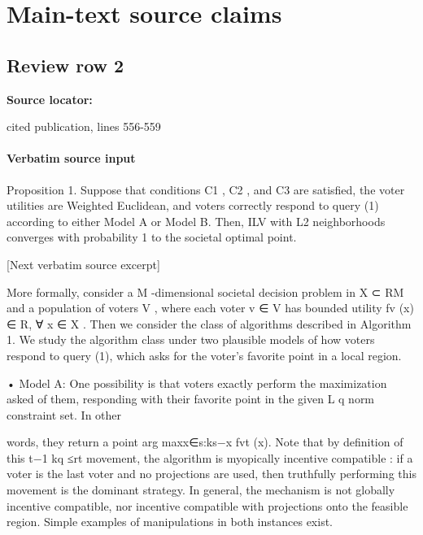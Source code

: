 \documentclass[10pt]{article}
\begin{document}
\section*{Main-text source claims}
\subsection*{Review row 2}
\textbf{Source locator:} {\footnotesize\raggedright cited publication, lines 556-\allowbreak{}559\par}
\paragraph{Verbatim source input}
\begin{ReviewVerbatim}
Proposition 1. Suppose that conditions C1 , C2 , and C3 are satisfied, the voter utilities are
Weighted Euclidean, and voters correctly respond to query (1) according to either Model A
or Model B. Then, ILV with L2 neighborhoods converges with probability 1 to the societal
optimal point.

[Next verbatim source excerpt]

   More formally, consider a M -dimensional societal decision problem in X  ⊂ RM and a
population of voters V , where each voter v ∈ V has bounded utility fv (x) ∈ R, ∀ x ∈ X .
Then we consider the class of algorithms described in Algorithm 1. We study the algorithm
class under two plausible models of how voters respond to query (1), which asks for the
voter's favorite point in a local region.



• Model A:       One possibility is that voters exactly perform the maximization asked of
  them, responding with their favorite point in the given L
                                                                       q norm constraint set. In other

  words, they return a point arg maxx∈{s:ks−x                    fvt (x). Note that by definition of this
                                                  t−1 kq ≤rt }
  movement, the algorithm is     myopically incentive compatible : if a voter is the last voter
  and no projections are used, then truthfully performing this movement is the dominant
  strategy.   In general, the mechanism is not globally incentive compatible, nor incentive
  compatible with projections onto the feasible region. Simple examples of manipulations
  in both instances exist.




\end{ReviewVerbatim}
\end{document}
